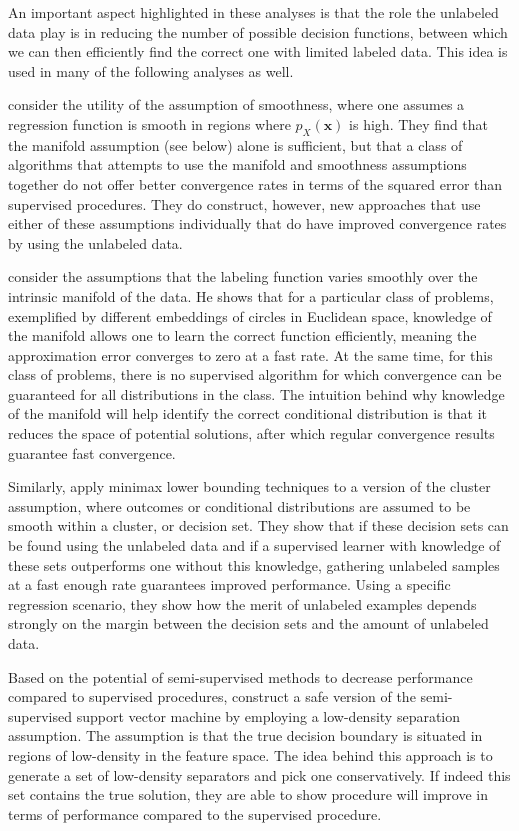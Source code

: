 \documentclass[twoside]{memoir}\usepackage[]{graphicx}\usepackage{xcolor}
\begin{document}
An important aspect highlighted in these analyses is that the role the unlabeled data play is in reducing the number of possible decision functions, between which we can then efficiently find the correct one with limited labeled data. This idea is used in many of the following analyses as well.

\citet{Lafferty2007} consider the utility of the assumption of smoothness, where one assumes a regression function is smooth in regions where $p_X(\mathbf{x})$ is high. They find that the manifold assumption (see below) alone is sufficient, but that a class of algorithms that attempts to use the manifold and smoothness assumptions together do not offer better convergence rates in terms of the squared error than supervised procedures. They do construct, however, new approaches that use either of these assumptions individually that do have improved convergence rates by using the unlabeled data.

\citet{Niyogi2013} consider the assumptions that the labeling function varies smoothly over the intrinsic manifold of the data. He shows that for a particular class of problems, exemplified by different embeddings of circles in Euclidean space, knowledge of the manifold allows one to learn the correct function efficiently, meaning the approximation error converges to zero at a fast rate. At the same time, for this class of problems, there is no supervised algorithm for which convergence can be guaranteed for all distributions in the class. The intuition behind why knowledge of the manifold will help identify the correct conditional distribution is that it reduces the space of potential solutions, after which regular convergence results guarantee fast convergence.

Similarly, \citet{Singh2008} apply minimax lower bounding techniques to a version of the cluster assumption, where outcomes or conditional distributions are assumed to be smooth within a cluster, or decision set. They show that if these decision sets can be found using the unlabeled data and if a supervised learner with knowledge of these sets outperforms one without this knowledge, gathering unlabeled samples at a fast enough rate guarantees improved performance. Using a specific regression scenario, they show how the merit of unlabeled examples depends strongly on the margin between the decision sets and the amount of unlabeled data.

Based on the potential of semi-supervised methods to decrease performance compared to supervised procedures, \citet{Li2015} construct a safe version of the semi-supervised support vector machine by employing a low-density separation assumption. The assumption is that the true decision boundary is situated in regions of low-density in the feature space. The idea behind this approach is to generate a set of low-density separators and pick one conservatively. If indeed this set contains the true solution, they are able to show procedure will improve in terms of performance compared to the supervised procedure.
\end{document}
